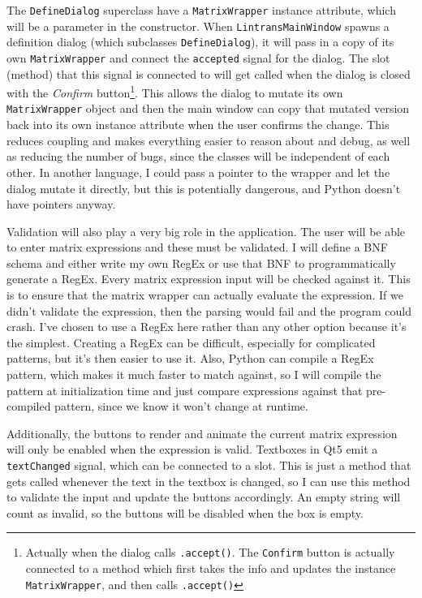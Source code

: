 \documentclass[../main.tex]{subfiles}
\begin{document}
The \texttt{DefineDialog} superclass have a \texttt{MatrixWrapper} instance attribute, which will be a parameter in the constructor. When \texttt{LintransMainWindow} spawns a definition dialog (which subclasses \texttt{DefineDialog}), it will pass in a copy of its own \texttt{MatrixWrapper} and connect the \texttt{accepted} signal for the dialog. The slot (method) that this signal is connected to will get called when the dialog is closed with the \textit{Confirm} button\footnote{Actually when the dialog calls \texttt{.accept()}. The \texttt{Confirm} button is actually connected to a method which first takes the info and updates the instance \texttt{MatrixWrapper}, and then calls \texttt{.accept()}}. This allows the dialog to mutate its own \texttt{MatrixWrapper} object and then the main window can copy that mutated version back into its own instance attribute when the user confirms the change. This reduces coupling and makes everything easier to reason about and debug, as well as reducing the number of bugs, since the classes will be independent of each other. In another language, I could pass a pointer to the wrapper and let the dialog mutate it directly, but this is potentially dangerous, and Python doesn't have pointers anyway.

Validation will also play a very big role in the application. The user will be able to enter matrix expressions and these must be validated. I will define a BNF schema and either write my own RegEx or use that BNF to programmatically generate a RegEx. Every matrix expression input will be checked against it. This is to ensure that the matrix wrapper can actually evaluate the expression. If we didn't validate the expression, then the parsing would fail and the program could crash. I've chosen to use a RegEx here rather than any other option because it's the simplest. Creating a RegEx can be difficult, especially for complicated patterns, but it's then easier to use it. Also, Python can compile a RegEx pattern, which makes it much faster to match against, so I will compile the pattern at initialization time and just compare expressions against that pre-compiled pattern, since we know it won't change at runtime.

Additionally, the buttons to render and animate the current matrix expression will only be enabled when the expression is valid. Textboxes in Qt5 emit a \texttt{textChanged} signal, which can be connected to a slot. This is just a method that gets called whenever the text in the textbox is changed, so I can use this method to validate the input and update the buttons accordingly. An empty string will count as invalid, so the buttons will be disabled when the box is empty.
\end{document}
